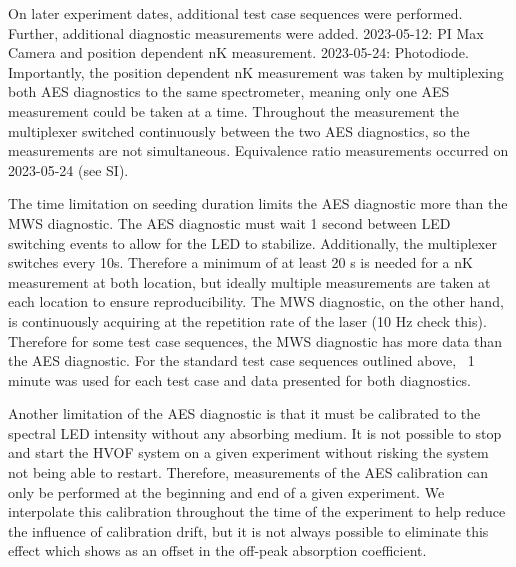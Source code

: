 On later experiment dates, additional test case sequences were performed. Further, additional diagnostic measurements were added. 2023-05-12: PI Max Camera and position dependent nK measurement. 2023-05-24: Photodiode. Importantly, the position dependent nK measurement was taken by multiplexing both AES diagnostics to the same spectrometer, meaning only one AES measurement could be taken at a time. Throughout the measurement the multiplexer switched continuously between the two AES diagnostics, so the measurements are not simultaneous. Equivalence ratio measurements occurred on 2023-05-24 (see SI). 

The time limitation on seeding duration limits the AES diagnostic more than the MWS diagnostic. The AES diagnostic must wait 1 second between LED switching events to allow for the LED to stabilize. Additionally, the multiplexer switches every 10s. Therefore a minimum of at least 20 s is needed for a nK measurement at both location, but ideally multiple measurements are taken at each location to ensure reproducibility. The MWS diagnostic, on the other hand, is continuously acquiring at the repetition rate of the laser (10 Hz check this). Therefore for some test case sequences, the MWS diagnostic has more data than the AES diagnostic. For the standard test case sequences outlined above, ~1 minute was used for each test case and data presented for both diagnostics.  

Another limitation of the AES diagnostic is that it must be calibrated to the spectral LED intensity without any absorbing medium. It is not possible to stop and start the HVOF system on a given experiment without risking the system not being able to restart. Therefore, measurements of the AES calibration can only be performed at the beginning and end of a given experiment. We interpolate this calibration throughout the time of the experiment to help reduce the influence of calibration drift, but it is not always possible to eliminate this effect which shows as an offset in the off-peak absorption coefficient.

